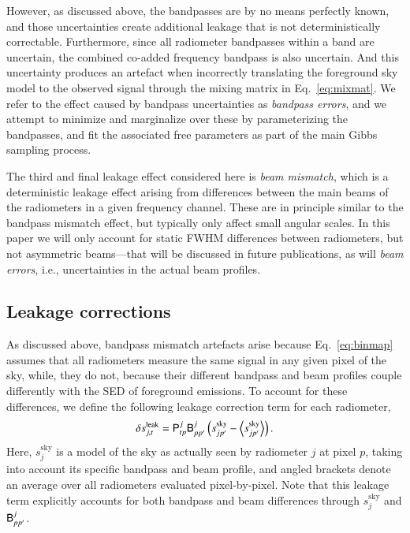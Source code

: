 \documentclass[twocolumn]{aa}
\newcommand{\B}[0]{\tens{B}}
\renewcommand{\P}[0]{\tens{P}}
\newcommand{\?}[1]{\textcolor{red}{{\bf [#1]}}}
\begin{document}
However, as discussed above, the bandpasses are by no means perfectly
known, and those uncertainties create additional leakage that is not
deterministically correctable.  Furthermore, since all radiometer
bandpasses within a band are uncertain, the combined co-added
frequency bandpass is also uncertain. And this uncertainty produces an
artefact when incorrectly translating the foreground sky model to the
observed signal through the mixing matrix in Eq.~\eqref{eq:mixmat}. We
refer to the effect caused by bandpass uncertainties as
\textit{bandpass errors}, and we attempt to minimize and marginalize
over these by parameterizing the bandpasses, and fit the associated
free parameters as part of the main Gibbs sampling process.

The third and final leakage effect considered here is \textit{beam mismatch},
which is a deterministic leakage effect arising from differences between the
main beams of the radiometers in a given frequency channel. These are in
principle similar to the bandpass mismatch effect, but typically only affect
small angular scales. In this paper we will only account for static FWHM
differences between radiometers, but not asymmetric beams---that will be
discussed in future publications, as will \emph{beam errors}, i.e.,
uncertainties in the actual beam profiles.

\subsection{Leakage corrections}
\label{sec:leakcorr}

As discussed above, bandpass mismatch artefacts arise because
Eq.~\eqref{eq:binmap} assumes that all radiometers measure the same signal in
any given pixel of the sky, while, they do not, because their different bandpass
and beam profiles couple differently with the SED of foreground emissions. To
account for these differences, we define the following leakage correction term
for each radiometer,
\begin{equation}
  \delta s^{\mathrm{leak}}_{j, t} = \P^{j}_{tp}\B_{pp'}^j\left(s^{\mathrm{sky}}_{jp'} - \left<s^{\mathrm{sky}}_{jp'}\right>\right).
 \label{eq:leak}
\end{equation}
Here, $s^{\mathrm{sky}}_{j}$ is a model of the sky as actually seen by
radiometer $j$ at pixel $p$, taking into account its specific bandpass and beam
profile, and angled brackets denote an average over all radiometers
evaluated pixel-by-pixel. Note that this leakage term explicitly
accounts for both bandpass and beam differences through
$s^{\mathrm{sky}}_{j}$ and $\B_{pp'}^j$.
\end{document}
